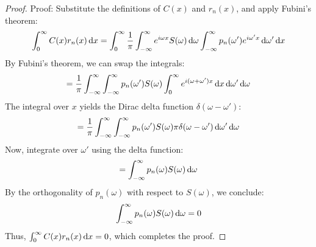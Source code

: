 \documentclass{article}
\newcommand{\mathd}{\mathrm{d}}
\begin{document}
\begin{proof}
  Proof: Substitute the definitions of $C (x)$ and $r_n (x)$, and apply
  Fubini's theorem:
  \begin{equation}
    \int_0^{\infty} C (x) r_n (x)  \hspace{0.17em} \mathd x = 
    \int_0^{\infty} \frac{1}{\pi} \int_{-\infty}^{\infty} e^{i \omega x} S (\omega) 
    \hspace{0.17em} \mathd \omega \int_{-\infty}^{\infty} p_n (\omega') e^{i \omega' x} 
    \hspace{0.17em} \mathd \omega'  \hspace{0.17em} \mathd x
  \end{equation}
  By Fubini's theorem, we can swap the integrals:
  \begin{equation}
    = \frac{1}{\pi}  \int_{-\infty}^{\infty} \int_{-\infty}^{\infty} p_n (\omega') S
    (\omega)  \int_0^{\infty} e^{i (\omega + \omega') x}  \hspace{0.17em} \mathd x
    \hspace{0.17em} \mathd \omega'  \hspace{0.17em} \mathd \omega
  \end{equation}
  The integral over $x$ yields the Dirac delta function $\delta (\omega -
  \omega')$:
  \begin{equation}
    = \frac{1}{\pi}  \int_{-\infty}^{\infty} \int_{-\infty}^{\infty} p_n (\omega') S
    (\omega) \pi \delta (\omega - \omega')  \hspace{0.17em} \mathd \omega'
    \hspace{0.17em} \mathd \omega
  \end{equation}
  Now, integrate over $\omega'$ using the delta function:
  \begin{equation}
    = \int_{-\infty}^{\infty} p_n (\omega) S (\omega)  \hspace{0.17em} \mathd \omega
  \end{equation}
  By the orthogonality of $p_n (\omega)$ with respect to $S (\omega)$, we
  conclude:
  \begin{equation}
    \int_{-\infty}^{\infty} p_n (\omega) S (\omega)  \hspace{0.17em} \mathd \omega = 0
  \end{equation}
  Thus, $\int_0^{\infty} C (x) r_n (x)  \hspace{0.17em} \mathd x = 0$, which
  completes the proof.
\end{proof}
\end{document}
